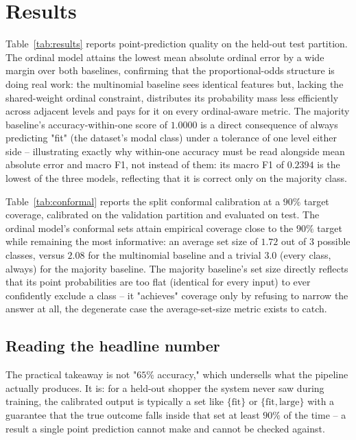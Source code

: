 \section{Results}
\label{sec:results}



Table~\ref{tab:results} reports point-prediction quality on the held-out test
partition. The ordinal model attains the lowest mean absolute ordinal error
by a wide margin over both baselines, confirming that the proportional-odds
structure is doing real work: the multinomial baseline sees identical
features but, lacking the shared-weight ordinal constraint, distributes its
probability mass less efficiently across adjacent levels and pays for it
on every ordinal-aware metric. The majority baseline's accuracy-within-one
score of $1.0000$ is a direct consequence of always predicting "fit" (the
dataset's modal class) under a tolerance of one level either side --
illustrating exactly why within-one accuracy must be read alongside mean
absolute error and macro F1, not instead of them: its macro F1 of
$0.2394$ is the lowest of the three models, reflecting that it is correct
only on the majority class.



Table~\ref{tab:conformal} reports the split conformal calibration at a
$90\%$ target coverage, calibrated on the validation partition and
evaluated on test. The ordinal model's conformal sets attain empirical
coverage close to the $90\%$ target while remaining the most informative:
an average set size of $1.72$ out of $3$ possible classes, versus $2.08$
for the multinomial baseline and a trivial $3.0$ (every class, always) for
the majority baseline. The majority baseline's set size directly reflects
that its point probabilities are too flat (identical for every input) to
ever confidently exclude a class -- it "achieves" coverage only by refusing
to narrow the answer at all, the degenerate case the average-set-size metric
exists to catch.

\subsection{Reading the headline number}

The practical takeaway is not "$65\%$ accuracy," which undersells what the
pipeline actually produces. It is: for a held-out shopper the system never
saw during training, the calibrated output is typically a set like
$\{\text{fit}\}$ or $\{\text{fit}, \text{large}\}$ with a guarantee that the
true outcome falls inside that set at least $90\%$ of the time -- a result a
single point prediction cannot make and cannot be checked against.
